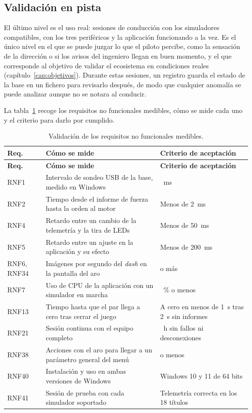\subsection{Validación en pista}
\label{subsec:pruebas-pista}
El último nivel es el uso real: sesiones de conducción con los simuladores compatibles, con los tres periféricos y la aplicación funcionando a la vez. Es el único nivel en el que se puede juzgar lo que el piloto percibe, como la sensación de la dirección o si los avisos del ingeniero llegan en buen momento, y el que corresponde al objetivo de validar el ecosistema en condiciones reales (capítulo~\ref{cap:objetivos}). Durante estas sesiones, un registro guarda el estado de la base en un fichero para revisarlo después, de modo que cualquier anomalía se puede analizar aunque no se notara al conducir.

La tabla~\ref{tab:pruebas-rnf} recoge los requisitos no funcionales medibles, cómo se mide cada uno y el criterio para darlo por cumplido.

{\small
\begin{longtable}{@{}>{\raggedright\arraybackslash}p{1.6cm}>{\raggedright\arraybackslash}p{7.6cm}>{\raggedright\arraybackslash}p{\dimexpr\textwidth-10cm\relax}@{}}
	\caption{Validación de los requisitos no funcionales medibles.}
	\label{tab:pruebas-rnf} \\
	\toprule
	\textbf{Req.} & \textbf{Cómo se mide} & \textbf{Criterio de aceptación} \\
	\midrule
	\endfirsthead
	\toprule
	\textbf{Req.} & \textbf{Cómo se mide} & \textbf{Criterio de aceptación} \\
	\midrule
	\endhead
		RNF1 & Intervalo de sondeo USB de la base, medido en Windows & 1~ms \\
		RNF2 & Tiempo desde el informe de fuerza hasta la orden al motor & Menos de 2~ms \\
		RNF4 & Retardo entre un cambio de la telemetría y la tira de LEDs & Menos de 50~ms \\
		RNF5 & Retardo entre un ajuste en la aplicación y su efecto & Menos de 200~ms \\
		RNF6, RNF34 & Imágenes por segundo del \textit{dash} en la pantalla del aro & 30 o más \\
		RNF7 & Uso de CPU de la aplicación con un simulador en marcha & 10~\% o menos \\
		RNF13 & Tiempo hasta que el par llega a cero tras cerrar el juego & A cero en menos de 1~s tras 2~s sin informes \\
		RNF21 & Sesión continua con el equipo completo & 3~h sin fallos ni desconexiones \\
		RNF38 & Acciones con el aro para llegar a un parámetro general del menú & 3 o menos \\
		RNF40 & Instalación y uso en ambas versiones de Windows & Windows 10 y 11 de 64 bits \\
		RNF41 & Sesión de prueba con cada simulador soportado & Telemetría correcta en los 18 títulos \\
	\bottomrule
\end{longtable}
}

